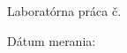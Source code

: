 \makeatletter
\begin{titlepage}
	\begin{center}
		
		\vspace*{100pt}
		
		{\Huge\textbf{\@title}}
		
		\vspace*{50pt}
		
		Laboratórna práca č. \labNum
			
	\end{center}

	\vfill

	Dátum merania: \measureDate
	\hfill
	\@author
\end{titlepage}

